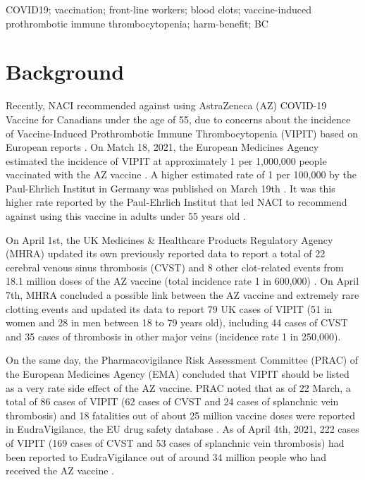 \documentclass[]{interact}
\theoremstyle{plain}%
\theoremstyle{definition}
\theoremstyle{remark}
\begin{document}
\begin{keywords}
COVID19; vaccination; front-line workers; blood clots; vaccine-induced
prothrombotic immune thrombocytopenia; harm-benefit; BC
\end{keywords}

\hypertarget{background}{%
\section{Background}\label{background}}

Recently, NACI recommended against using AstraZeneca (AZ) COVID-19
Vaccine for Canadians under the age of 55, due to concerns about the
incidence of Vaccine-Induced Prothrombotic Immune Thrombocytopenia
(VIPIT) based on European reports \citep{naci_naci_2021}. On Match 18,
2021, the European Medicines Agency estimated the incidence of VIPIT at
approximately 1 per 1,000,000 people vaccinated with the AZ vaccine
\citep{ema_covid-19_2021}. A higher estimated rate of 1 per 100,000 by
the Paul-Ehrlich Institut in Germany was published on March 19th
\citep{pei_covid-19_2021}. It was this higher rate reported by the
Paul-Ehrlich Institut that led NACI to recommend against using this
vaccine in adults under 55 years old \citep{naci_naci_2021}.

On April 1st, the UK Medicines \& Healthcare Products Regulatory Agency
(MHRA) updated its own previously reported data to report a total of 22
cerebral venous sinus thrombosis (CVST) and 8 other clot-related events
from 18.1 million doses of the AZ vaccine (total incidence rate 1 in
600,000) \citep{mhra_coronavirus_2021}. On April 7th, MHRA concluded a
possible link between the AZ vaccine and extremely rare clotting events
and updated its data to report 79 UK cases of VIPIT (51 in women and 28
in men between 18 to 79 years old), including 44 cases of CVST and 35
cases of thrombosis in other major veins (incidence rate 1 in
250,000)\citep{mhra_mhra_2021}.

On the same day, the Pharmacovigilance Risk Assessment Committee (PRAC)
of the European Medicines Agency (EMA) concluded that VIPIT should be
listed as a very rate side effect of the AZ vaccine. PRAC noted that as
of 22 March, a total of 86 cases of VIPIT (62 cases of CVST and 24 cases
of splanchnic vein thrombosis) and 18 fatalities out of about 25 million
vaccine doses were reported in EudraVigilance, the EU drug safety
database \citep{ema_astrazenecas_2021}. As of April 4th, 2021, 222 cases
of VIPIT (169 cases of CVST and 53 cases of splanchnic vein thrombosis)
had been reported to EudraVigilance out of around 34 million people who
had received the AZ vaccine \citep{ema_astrazenecas_2021}.
\end{document}
